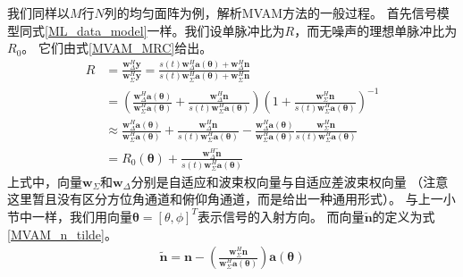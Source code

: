 \documentclass[master]{thesis-uestc}
\begin{document}
我们同样以$M$行$N$列的均匀面阵为例，解析MVAM方法的一般过程。
首先信号模型同式\eqref{ML_data_model}一样。我们设单脉冲比为$R$，而无噪声的理想单脉冲比为$R_0$。
它们由式\eqref{MVAM_MRC}给出。
\begin{equation}\label{MVAM_MRC}
    \begin{aligned}
        R &= \frac{\bm{w}^H_\Delta\bm{y}}{\bm{w}^H_\Sigma\bm{y}}
        = \frac{s(t)\bm{w}^H_\Delta\bm{a}(\bm{\theta}) + \bm{w}^H_\Delta\bm{n}}
               {s(t)\bm{w}^H_\Sigma\bm{a}(\bm{\theta}) + \bm{w}^H_\Sigma\bm{n}} \\
        &= \left(
                \frac{\bm{w}^H_\Delta\bm{a}(\bm{\theta})}{\bm{w}^H_\Sigma\bm{a}(\bm{\theta})} + 
                \frac{\bm{w}^H_\Delta\bm{n}}{s(t)\bm{w}^H_\Sigma\bm{a}(\bm{\theta})}
           \right)
           \left(1 + \frac{\bm{w}^H_\Sigma\bm{n}}{s(t)\bm{w}^H_\Sigma\bm{a}(\bm{\theta})}\right)^{-1} \\
        &\approx \frac{\bm{w}^H_\Delta\bm{a}(\bm{\theta})}{\bm{w}^H_\Sigma\bm{a}(\bm{\theta})} + 
                 \frac{\bm{w}^H_\Delta\bm{n}}{s(t)\bm{w}^H_\Sigma\bm{a}(\bm{\theta})} - 
                 \frac{\bm{w}^H_\Delta\bm{a}(\bm{\theta})}{\bm{w}^H_\Sigma\bm{a}(\bm{\theta})}
                 \frac{\bm{w}^H_\Sigma\bm{n}}{s(t)\bm{w}^H_\Sigma\bm{a}(\bm{\theta})} \\
        &= R_0(\bm{\theta}) + \frac{\bm{w}^H_\Delta\tilde{\bm{n}}}{s(t)\bm{w}^H_\Sigma\bm{a}(\bm{\theta})}
    \end{aligned}
\end{equation}
上式中，向量$\bm{w}_\Sigma$和$\bm{w}_\Delta$分别是自适应和波束权向量与自适应差波束权向量
（注意这里暂且没有区分方位角通道和俯仰角通道，而是给出一种通用形式）。
与上一小节中一样，我们用向量$\bm{\theta}=\left[\theta,\phi\right]^T$表示信号的入射方向。
而向量$\tilde{\bm{n}}$的定义为式\eqref{MVAM_n_tilde}。
\begin{equation}\label{MVAM_n_tilde}
    \begin{aligned}
        \tilde{\bm{n}} = \bm{n} - 
        \left(\frac{\bm{w}^H_\Sigma\bm{n}}{\bm{w}^H_\Sigma\bm{a}(\bm{\theta})}\right)\bm{a}(\bm{\theta})
    \end{aligned}
\end{equation}
\end{document}
